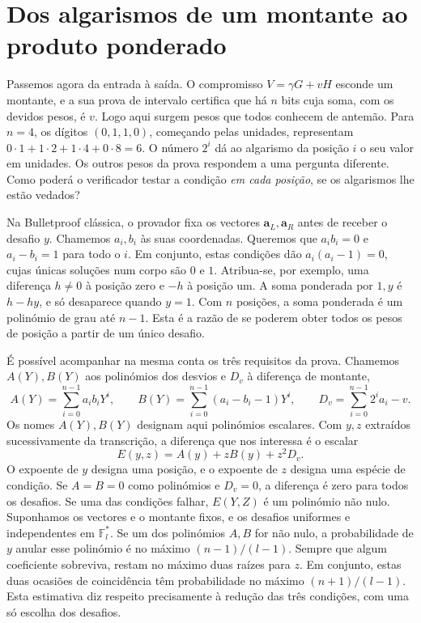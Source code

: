 \section{Dos algarismos de um montante ao produto ponderado}
\label{sec:gbp-pesos-intervalo}

Passemos agora da entrada à saída. O compromisso \(V=\gamma G+vH\)
esconde um montante, e a sua prova de intervalo certifica que há \(n\)
bits cuja soma, com os devidos pesos, é \(v\). Logo aqui surgem pesos
que todos conhecem de antemão. Para \(n=4\), os dígitos
\((0,1,1,0)\), começando pelas unidades, representam
\(0\cdot1+1\cdot2+1\cdot4+0\cdot8=6\). O número \(2^i\) dá ao
algarismo da posição \(i\) o seu valor em unidades. Os outros pesos da
prova respondem a uma pergunta diferente. Como poderá o verificador
testar a condição \emph{em cada posição}, se os algarismos lhe estão
vedados?

Na Bulletproof clássica, o provador fixa os vectores
\(\boldsymbol a_L,\boldsymbol a_R\) antes de receber o desafio \(y\).
Chamemos \(a_i,b_i\) às suas coordenadas. Queremos que \(a_ib_i=0\)
e \(a_i-b_i=1\) para todo o \(i\). Em conjunto, estas condições dão
\(a_i(a_i-1)=0\), cujas únicas soluções num corpo são \(0\) e \(1\).
Atribua-se, por exemplo,
uma diferença \(h\ne0\) à posição zero e \(-h\) à posição um. A
soma ponderada por \(1,y\) é \(h-hy\), e só desaparece quando \(y=1\).
Com \(n\) posições, a soma ponderada é um polinómio de grau até
\(n-1\). Esta é a razão de se poderem obter todos os pesos de posição
a partir de um único desafio.

É possível acompanhar na mesma conta os três requisitos da prova.
Chamemos \(A(Y), B(Y)\) aos polinómios dos desvios e \(D_v\) à
diferença de montante,
\[
 A(Y)=\sum_{i=0}^{n-1}a_ib_iY^i,\qquad
 B(Y)=\sum_{i=0}^{n-1}(a_i-b_i-1)Y^i,\qquad
 D_v=\sum_{i=0}^{n-1}2^ia_i-v .
\]
Os nomes \(A(Y),B(Y)\) designam aqui polinómios escalares. Com
\(y,z\) extraídos sucessivamente da transcrição, a diferença que nos interessa
é o escalar
\begin{equation}
 E(y,z)=A(y)+zB(y)+z^2D_v.
 \label{eq:gbp-bp-residuos}
\end{equation}
O expoente de \(y\) designa uma posição, e o expoente de \(z\) designa
uma espécie de condição. Se \(A=B=0\) como polinómios e \(D_v=0\),
a diferença é zero para todos os desafios. Se uma das condições falhar,
\(E(Y,Z)\) é um polinómio não nulo. Suponhamos os vectores e o montante
fixos, e os desafios uniformes e independentes em \(\mathbb F_l^*\).
Se um dos polinómios \(A,B\) for não nulo, a probabilidade de \(y\)
anular esse polinómio é no máximo \((n-1)/(l-1)\). Sempre que algum
coeficiente sobreviva, restam no máximo duas raízes para \(z\). Em
conjunto, estas duas ocasiões de coincidência têm probabilidade no
máximo \((n+1)/(l-1)\). Esta estimativa diz respeito precisamente à
redução das três condições, com uma só escolha dos desafios.

